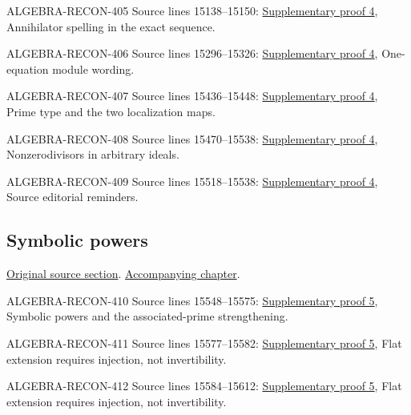\begin{AlgebraSourceRoutes}
\item[ALGEBRA-RECON-405] Source lines 15138--15150: \hyperlink{algebra_dimension_support_associated_notes_20260927}{Supplementary proof 4}, Annihilator spelling in the exact sequence.
\item[ALGEBRA-RECON-406] Source lines 15296--15326: \hyperlink{algebra_dimension_support_associated_notes_20260927}{Supplementary proof 4}, One-equation module wording.
\item[ALGEBRA-RECON-407] Source lines 15436--15448: \hyperlink{algebra_dimension_support_associated_notes_20260927}{Supplementary proof 4}, Prime type and the two localization maps.
\item[ALGEBRA-RECON-408] Source lines 15470--15538: \hyperlink{algebra_dimension_support_associated_notes_20260927}{Supplementary proof 4}, Nonzerodivisors in arbitrary ideals.
\item[ALGEBRA-RECON-409] Source lines 15518--15538: \hyperlink{algebra_dimension_support_associated_notes_20260927}{Supplementary proof 4}, Source editorial reminders.
\end{AlgebraSourceRoutes}

\subsection{Symbolic powers}
\hypertarget{algebra-source-section-symbolic-power}{}
\noindent\href{https://github.com/stacks/stacks-project/blob/a04446e57ec1fbc252a871afcec7752fb2807b14/algebra.tex\#L15542}{Original source section}. \href{algebra.pdf\#nameddest=section-symbolic-power}{Accompanying chapter}.

\begin{AlgebraSourceRoutes}
\item[ALGEBRA-RECON-410] Source lines 15548--15575: \hyperlink{algebra_symbolic_weakass_notes_20260927}{Supplementary proof 5}, Symbolic powers and the associated-prime strengthening.
\item[ALGEBRA-RECON-411] Source lines 15577--15582: \hyperlink{algebra_symbolic_weakass_notes_20260927}{Supplementary proof 5}, Flat extension requires injection, not invertibility.
\item[ALGEBRA-RECON-412] Source lines 15584--15612: \hyperlink{algebra_symbolic_weakass_notes_20260927}{Supplementary proof 5}, Flat extension requires injection, not invertibility.
\end{AlgebraSourceRoutes}


